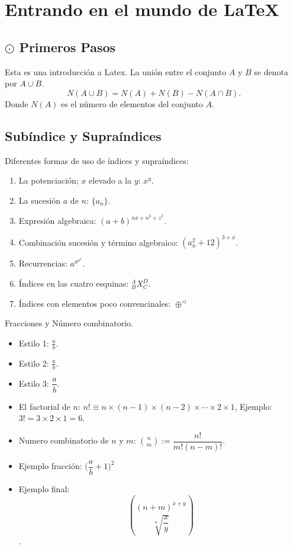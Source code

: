 \chapter{Entrando en el mundo de \LaTeX}
\section*{$\odot$ Primeros Pasos}
Esta es una introducción a Latex. La unión entre el conjunto $A$ y $B$ se denota por $A\cup B$.
\begin{displaymath}
N(A\cup B)=N(A)+N(B)-N(A\cap B).
\end{displaymath}
Donde $N(A)$ es el número de elementos del conjunto $A$. 
\section{Subíndice y Supraíndices}
Diferentes formas de uso de índices y supraíndices:
\begin{enumerate}
\item La potenciación; $x$ elevado a la $y$: $x^y$. 
\item La sucesión $a$ de $n$: $\{a_n\}$. 
\item Expresión algebraica: $(a+b)^{nx+n^2+z^2}$.
\item Combinación sucesión y término algebraico: $(a_n^2+12)^{3+x}$.
\item Recurrencias: $a^{a^{a^a}}$.
\item Índices en las cuatro esquinas: $^{A}_{B}X_{C}^{D}$.
\item Índices con elementos poco convencinales: $\oplus^{\lhd}$
\end{enumerate}
\newpage
Fracciones y Número combinatorio. 
\begin{itemize}
\item Estilo 1: $\frac{a}{b}.$
\item Estilo 2: $\displaystyle\frac{a}{b}.$
\item Estilo 3: $\dfrac{a}{b}.$
\item El factorial de $n$: $n!\equiv n\times(n-1)\times(n-2)\times\cdots \times 2\times 1$, Ejemplo: $3!=3\times 2\times 1=6$.
\item Numero combinatorio de $n$ y $m$: $\displaystyle\binom{n}{m}:=\dfrac{n!}{m!(n-m)!}$.
\item Ejemplo fracción: $\bigg(\dfrac{a}{b}+1\bigg)^2$
\item Ejemplo final: $$\displaystyle \binom{(n+m)^{x+y}}{\sqrt[n]{\dfrac{x}{y}}}$$.
\end{itemize}
